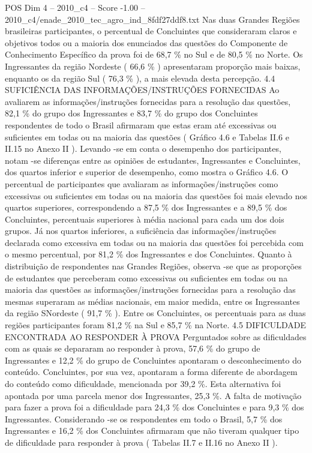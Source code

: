 \begin{textsample}{POS Dim 4 – 2010\_c4 – Score -1.00 – 2010\_c4/enade\_2010\_tec\_agro\_ind\_8fdf27ddf8.txt}
Nas duas Grandes Regiões brasileiras participantes, o percentual de Concluintes que consideraram claros e objetivos todos ou a maioria dos enunciados das questões do Componente de Conhecimento Específico da prova foi de 68,7 \% no Sul e de 80,5 \% no Norte.
Os Ingressantes da região Nordeste ( 66,6 \% ) apresentaram proporção mais baixas, enquanto os da região Sul ( 76,3 \% ), a mais elevada desta percepção. 4.4 SUFICIÊNCIA DAS INFORMAÇÕES/INSTRUÇÕES FORNECIDAS Ao avaliarem as informações/instruções fornecidas para a resolução das questões, 82,1 \% do grupo dos Ingressantes e 83,7 \% do grupo dos Concluintes respondentes de todo o Brasil afirmaram que estas eram até excessivas ou suficientes em todas ou na maioria das questões ( Gráfico 4.6 e Tabelas II.6 e II.15 no Anexo II ).
Levando -se em conta o desempenho dos participantes, notam -se diferenças entre as opiniões de estudantes, Ingressantes e Concluintes, dos quartos inferior e superior de desempenho, como mostra o Gráfico 4.6.
O percentual de participantes que avaliaram as informações/instruções como excessivas ou suficientes em todas ou na maioria das questões foi mais elevado nos quartos superiores, correspondendo a 87,5 \% dos Ingressantes e a 89,5 \% dos Concluintes, percentuais superiores à média nacional para cada um dos dois grupos.
Já nos quartos inferiores, a suficiência das informações/instruções declarada como excessiva em todas ou na maioria das questões foi percebida com o mesmo percentual, por 81,2 \% dos Ingressantes e dos Concluintes.
Quanto à distribuição de respondentes nas Grandes Regiões, observa -se que as proporções de estudantes que perceberam como excessivas ou suficientes em todas ou na maioria das questões as informações/instruções fornecidas para a resolução das mesmas superaram as médias nacionais, em maior medida, entre os Ingressantes da região SNordeste ( 91,7 \% ).
Entre os Concluintes, os percentuais para as duas regiões participantes foram 81,2 \% na Sul e 85,7 \% na Norte. 4.5 DIFICULDADE ENCONTRADA AO RESPONDER À PROVA Perguntados sobre as dificuldades com as quais se depararam ao responder à prova, 57,6 \% do grupo de Ingressantes e 12,2 \% do grupo de Concluintes apontaram o desconhecimento do conteúdo.
Concluintes, por sua vez, apontaram a forma diferente de abordagem do conteúdo como dificuldade, mencionada por 39,2 \%.
Esta alternativa foi apontada por uma parcela menor dos Ingressantes, 25,3 \%.
A falta de motivação para fazer a prova foi a dificuldade para 24,3 \% dos Concluintes e para 9,3 \% dos Ingressantes.
Considerando -se os respondentes em todo o Brasil, 5,7 \% dos Ingressantes e 16,2 \% dos Concluintes afirmaram que não tiveram qualquer tipo de dificuldade para responder à prova ( Tabelas II.7 e II.16 no Anexo II ).

\end{textsample}
